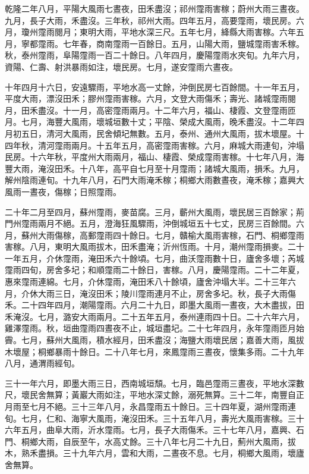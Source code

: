 \begin{pinyinscope}
乾隆二年八月，平陽大風雨七晝夜，田禾盡沒；祁州霪雨害稼；蔚州大雨三晝夜。九月，長子大雨，禾盡沒。三年秋，祁州大雨。四年五月，高要霪雨，壞民房。六月，瓊州霪雨閱月；東明大雨，平地水深三尺。五年七月，絳縣大雨害稼。六年五月，寧都霪雨。七年春，商南霪雨一百餘日。五月，山陽大雨，鹽城霪雨害禾稼。秋，泰州霪雨，阜陽霪雨一百二十餘日。八年四月，慶陽霪雨水夾旬。九年六月，資陽、仁壽、射洪暴雨如注，壞民房。七月，遂安霪雨六晝夜。

十年四月十六日，安遠驟雨，平地水高一丈餘，沖倒民房七百餘間。十一年五月，平度大雨，漂沒田禾；膠州霪雨害稼。六月，文登大雨傷禾；壽光、諸城霪雨閱月，田禾盡沒。十一月，高密霪雨兩月。十二年六月，福山、棲霞、文登霪雨匝月。七月，海豐大風雨，壞城垣數十丈；平陰、榮成大風雨，晚禾盡沒。十二年四月初五日，清河大風雨，民舍傾圮無數。五月，泰州、通州大風雨，拔木壞屋。十四年秋，清河霪雨兩月。十五年五月，高密霪雨害稼。六月，麻城大雨連旬，沖塌民房。十六年秋，平度州大雨兩月，福山、棲霞、榮成霪雨害稼。十七年八月，海豐大雨，淹沒田禾。十八年，高平自七月至十月霪雨；諸城大風雨，損禾。九月，解州陰雨連旬。十九年八月，石門大雨淹禾稼；桐鄉大雨數晝夜，淹禾稼；嘉興大風雨一晝夜，傷稼；日照霪雨。

二十年二月至四月，蘇州霪雨，麥苗腐。三月，蘄州大風雨，壞民居三百餘家；荊門州霪雨兩月不絕。五月，澄海狂風驟雨，沖倒城垣五十七丈，民房三百餘間。六月，蘇州大雨傷稼，高郵霪雨四十餘日。七月，贛榆大風雨害稼，石門、桐鄉霪雨害稼。八月，東明大風雨拔木，田禾盡淹；沂州恆雨。十月，潮州霪雨損麥。二十一年五月，介休霪雨，淹田禾六十餘頃。七月，曲沃霪雨數十日，廬舍多壞；芮城霪雨四旬，房舍多圮；和順霪雨二十餘日，害稼。八月，慶陽霪雨。二十二年夏，惠來霪雨連綿。七月，介休霪雨，淹田禾八十餘頃，廬舍沖塌大半。二十三年六月，介休大雨三日，淹沒田禾；陵川霪雨連月不止，房舍多圮。秋，長子大雨傷禾。二十四年四月，潮陽霪雨。六月二十九日，即墨大風雨一晝夜，大木盡拔，田禾淹沒。七月，潞安大雨兩月。二十五年五月，泰州連雨四十日。二十六年六月，雞澤霪雨。秋，垣曲霪雨四晝夜不止，城垣盡圮。二十七年四月，永年霪雨匝月始霽。七月，蘇州大風雨，積水經月，田禾盡沒；海鹽大雨壞民居；嘉善大雨，風拔木壞屋；桐鄉暴雨十餘日。二十八年七月，來鳳霪雨三晝夜，懷集多雨。二十九年八月，通渭雨經旬。

三十一年六月，即墨大雨三日，西南城垣頹。七月，臨邑霪雨三晝夜，平地水深數尺，壞民舍無算；黃巖大雨如注，平地水深丈餘，溺死無算。三十二年，南豐自正月雨至七月不絕。三十三年八月，永昌霪雨五十餘日。三十四年夏，湖州霪雨連旬。七月，仁和、海寧大風雨，淹沒田禾。三十五年八月，壽光大風雨害稼。三十六年五月，曲阜大雨，沂水霪雨。七月，長子大雨傷禾。三十七年八月，嘉興、石門、桐鄉大雨，自辰至午，水高丈餘。三十八年七月二十九日，薊州大風雨，拔木，熟禾盡損。三十九年六月，雲和大雨，二晝夜不息。七月，桐鄉大風雨，壞廬舍無算。


\end{pinyinscope}

